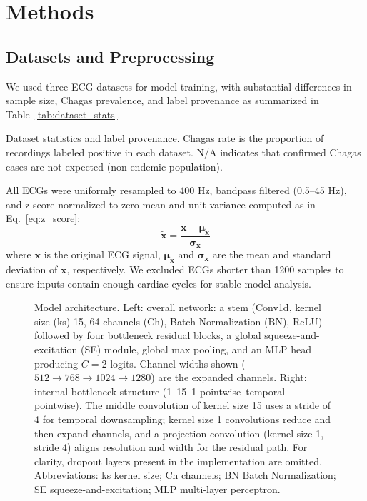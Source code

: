 \section{Methods}
\label{sec:methods}


\subsection{Datasets and Preprocessing}
\label{subsec:data}


We used three ECG datasets for model training, with substantial differences in sample size, Chagas prevalence, and label provenance as summarized in Table~\ref{tab:dataset_stats}.

\setlength{\tabcolsep}{4pt} %
\begin{table}[!htp]
\centering

\caption{Dataset statistics and label provenance. Chagas rate is the proportion of recordings labeled positive in each dataset. N/A indicates that confirmed Chagas cases are not expected (non-endemic population).}
\label{tab:dataset_stats}
\end{table}
\setlength{\tabcolsep}{6pt} %

All ECGs were uniformly resampled to 400 Hz, bandpass filtered (0.5–45 Hz), and z-score normalized to zero mean and unit variance computed as in Eq.~\ref{eq:z_score}:
\begin{equation}
\label{eq:z_score}
\tilde{\mathbf{x}} = \frac{\mathbf{x} - \boldsymbol{\mu}_{\mathbf{x}}}{\boldsymbol{\sigma}_{\mathbf{x}}}
\end{equation}
where $\mathbf{x}$ is the original ECG signal, $\boldsymbol{\mu}_{\mathbf{x}}$ and $\boldsymbol{\sigma}_{\mathbf{x}}$ are the mean and standard deviation of $\mathbf{x}$, respectively. We excluded ECGs shorter than 1200 samples to ensure inputs contain enough cardiac cycles for stable model analysis.


\begin{figure*}[!t]
\centering

\caption{Model architecture. Left: overall network: a stem (Conv1d, kernel size (ks) 15, 64 channels (Ch), Batch Normalization (BN), ReLU) followed by four bottleneck residual blocks, a global squeeze-and-excitation (SE) module, global max pooling, and an MLP head producing $C = 2$ logits. Channel widths shown ($512 \to 768 \to 1024 \to 1280$) are the expanded channels.
Right: internal bottleneck structure (1--15--1 pointwise--temporal--pointwise). The middle convolution of kernel size 15 uses a stride of 4 for temporal downsampling; kernel size 1 convolutions reduce and then expand channels, and a projection convolution (kernel size 1, stride 4) aligns resolution and width for the residual path. For clarity, dropout layers present in the implementation are omitted. Abbreviations: ks kernel size; Ch channels; BN Batch Normalization; SE squeeze-and-excitation; MLP multi-layer perceptron.}
\label{fig:model}
\end{figure*}


